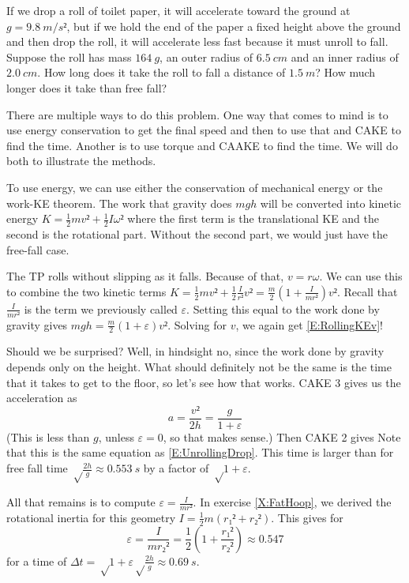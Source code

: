 \begin{example} 
If we drop a roll of toilet paper, it will accelerate toward the ground at $g=9.8\ m/s²$, but if we hold the end of the paper a fixed height above the ground and then drop the roll, it will accelerate less fast because it must unroll to fall. Suppose the roll has mass $164\ g$, an outer radius of $6.5\ cm$ and an inner radius of $2.0\ cm$. How long does it take the roll to fall a distance of $1.5\ m$? How much longer does it take than free fall?

\begin{solution}
There are multiple ways to do this problem. One way that comes to mind is to use energy conservation to get the final speed and then to use that and CAKE to find the time. Another is to use torque and CAAKE to find the time. We will do both to illustrate the methods. 

To use energy, we can use either the conservation of mechanical energy or the work-KE theorem. The work that gravity does $mgh$ will be converted into kinetic energy $K=\frac12 mv² +\frac 12 Iω² $ where the first term is the translational KE and the second is the rotational part. Without the second part, we would just have the free-fall case. 

The TP rolls without slipping as it falls. Because of that, $v=rω$. We can use this to combine the two kinetic terms $K=\frac12 mv² +\frac 12 \frac I{r²} v² = \frac m2\left( 1+ \frac I{mr²}\right) v²$. Recall that $\frac I{mr²}$ is the term we previously called $ε$. Setting this equal to the work done by gravity gives $mgh =\frac m2\left( 1+ ε \right) v²$. Solving for $v$, we again get \eqref{E:RollingKEv}! 

Should we be surprised? Well, in hindsight no, since the work done by gravity depends only on the height. What should definitely not be the same is the time that it takes to get to the floor, so let's see how that works. CAKE 3 gives us the acceleration as
$$
a = \frac {v²}{2h} = \frac g{1+ε}
$$
(This is less than $g$, unless $ε =0$, so that makes sense.) Then CAKE 2 gives 
Note that this is the same equation as \eqref{E:UnrollingDrop}. 
This time is larger than for free fall time $√{\frac{2h}{g}}≈ 0.553\ s$ by a factor of $√{1+ε}$. 

All that remains is to compute $ε=\frac I{mr²}$. In exercise \ref{X:FatHoop}, we derived the rotational inertia for this geometry $I=\frac12 m (r₁² + r₂²)$. This gives for 
$$
ε = \frac I{mr₂²} = \frac12 \left(1+\frac{r₁²}{r₂²}\right) ≈ 0.547
$$
for a time of $Δt = √{1+ε}√{\frac{2h}{g}} ≈  0.69\ s$.


\end{solution}
\end{example}
